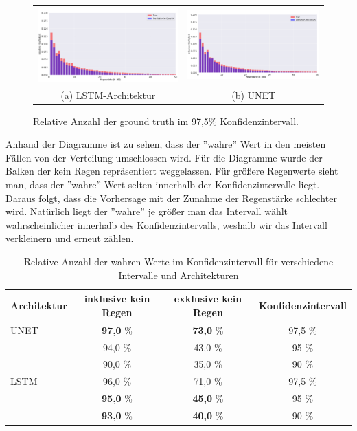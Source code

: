 \begin{figure}[h]
\centering
\begin{tabular}{cc}
\includegraphics[width=80mm]{abb/dist_LSTM.png}&
\includegraphics[width=80mm]{abb/dist_UNET.png}\\
(a) \small{LSTM-Architektur} & (b) \small{UNET}
\end{tabular}
\caption{Relative Anzahl der ground truth im 97,5\% Konfidenzintervall. \label{fig:dist}}
\end{figure}

\noindent Anhand der Diagramme ist zu sehen, dass der ''wahre'' Wert in den meisten Fällen von der Verteilung umschlossen wird. Für die Diagramme wurde der Balken der kein Regen repräsentiert weggelassen. Für größere Regenwerte sieht man, dass der ''wahre'' Wert selten innerhalb der Konfidenzintervalle liegt. Daraus folgt, dass die Vorhersage mit der Zunahme der Regenstärke schlechter wird. Natürlich liegt der ''wahre'' je größer man das Intervall wählt wahrscheinlicher innerhalb des Konfidenzintervalls, weshalb wir das Intervall verkleinern und erneut zählen.\\



\begin{table}[h]
\centering
\begin{tabular}[h]{l|c|c|c}
Architektur & inklusive kein Regen & exklusive kein Regen & Konfidenzintervall \\
\hline
UNET & \textbf{97,0} \% & \textbf{73,0} \%  & 97,5 \%\\
 & 94,0 \% & 43,0 \% & 95 \% \\
 & 90,0 \% & 35,0 \% & 90 \% \\
 \hline
LSTM &96,0 \% & 71,0 \% & 97,5 \% \\
 &\textbf{95,0} \% & \textbf{45,0} \% & 95 \% \\
 &\textbf{93,0} \% & \textbf{40,0} \% & 90 \% \\

\end{tabular}
\caption{ Relative Anzahl der wahren Werte im Konfidenzintervall für verschiedene Intervalle und Architekturen\label{tab:konv}}
\end{table}

